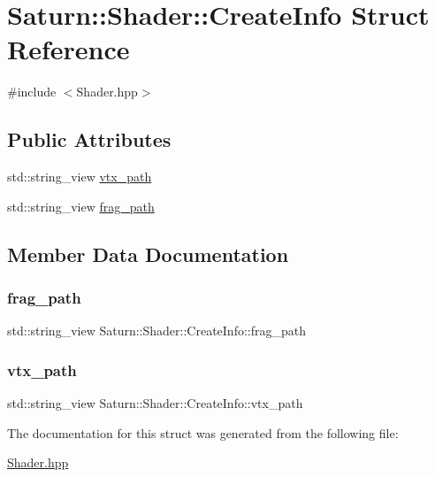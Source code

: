\hypertarget{struct_saturn_1_1_shader_1_1_create_info}{}\section{Saturn\+:\+:Shader\+:\+:Create\+Info Struct Reference}
\label{struct_saturn_1_1_shader_1_1_create_info}


{\ttfamily \#include $<$Shader.\+hpp$>$}

\subsection*{Public Attributes}
\begin{DoxyCompactItemize}
\item 
std\+::string\+\_\+view \mbox{\hyperlink{struct_saturn_1_1_shader_1_1_create_info_acde6995820534697387f87761f5de129}{vtx\+\_\+path}}
\item 
std\+::string\+\_\+view \mbox{\hyperlink{struct_saturn_1_1_shader_1_1_create_info_acdec925e9ce5e2f6f187f79f8ab87c09}{frag\+\_\+path}}
\end{DoxyCompactItemize}


\subsection{Member Data Documentation}
\mbox{\label{struct_saturn_1_1_shader_1_1_create_info_acdec925e9ce5e2f6f187f79f8ab87c09}} 
\subsubsection{\texorpdfstring{frag\+\_\+path}{frag\_path}}
{\footnotesize\ttfamily std\+::string\+\_\+view Saturn\+::\+Shader\+::\+Create\+Info\+::frag\+\_\+path}

\mbox{\label{struct_saturn_1_1_shader_1_1_create_info_acde6995820534697387f87761f5de129}} 
\subsubsection{\texorpdfstring{vtx\+\_\+path}{vtx\_path}}
{\footnotesize\ttfamily std\+::string\+\_\+view Saturn\+::\+Shader\+::\+Create\+Info\+::vtx\+\_\+path}



The documentation for this struct was generated from the following file\+:\begin{DoxyCompactItemize}
\item 
\mbox{\hyperlink{_shader_8hpp}{Shader.\+hpp}}\end{DoxyCompactItemize}
